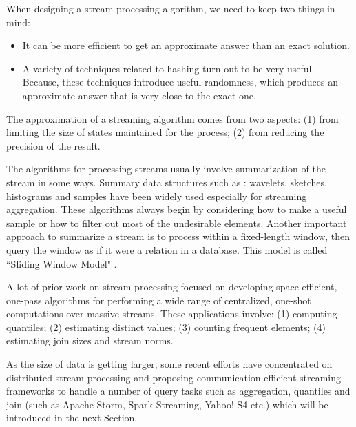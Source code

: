 \documentclass[	DIV=calc,%
							paper=a4,%
							fontsize=11pt,%
							twocolumn]{scrartcl}	 					%
\begin{document}
When designing a stream processing algorithm, we need to keep two things in mind:

\begin{itemize}

\item It can be more efficient to get an approximate answer than an exact solution.

\item A variety of techniques related to hashing turn out to be very useful. Because, these techniques introduce useful randomness, which produces an approximate answer that is very close to the exact one.

\end{itemize}

The approximation of a streaming algorithm comes from two aspects: (1) from limiting the size of states maintained for the process; (2) from reducing the precision of the result. 

The algorithms for processing streams usually involve summarization of the stream in some ways. Summary data structures such as : wavelets, sketches, histograms and samples have been widely used especially  for streaming aggregation. These algorithms always begin by considering how to make a useful sample or how to filter out most of the undesirable elements. Another important approach to summarize a stream is to process within a fixed-length window, then query the window as if it were a relation in a database. This model is called ``Sliding Window Model" \cite{SlidingWindow}.


A lot of prior work on stream processing focused on developing space-efficient, one-pass algorithms for performing a wide range of centralized, one-shot computations over massive streams. These applications involve: (1) computing quantiles; (2) estimating distinct values; (3) counting frequent elements; (4) estimating join sizes and stream norms.

As the size of data is getting larger, some recent efforts have concentrated on distributed stream processing and proposing communication efficient streaming frameworks to handle a number of query tasks such as aggregation, quantiles and join (such as Apache Storm, Spark Streaming, Yahoo! S4 etc.) which will be introduced in the next Section.  
\end{document}
